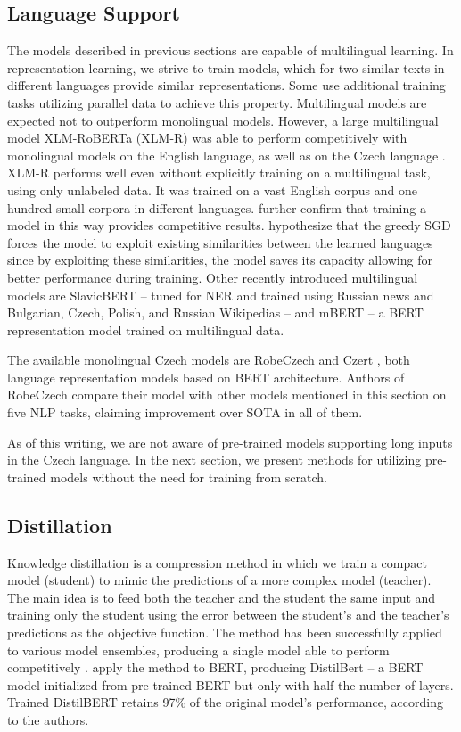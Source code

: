\subsection{Language Support}

The models described in previous sections are capable of multilingual learning.
In representation learning, we strive to train models, which for two similar texts in different languages provide similar representations.
Some \citep{cross-lingual} use additional training tasks utilizing parallel data to achieve this property.
Multilingual models are expected not to outperform monolingual models.
However, a large multilingual model XLM-RoBERTa (XLM-R) \citep{xlmr} was able to perform competitively with monolingual models on the English language, as well as on the Czech language \citep{mackova}.
XLM-R performs well even without explicitly training on a multilingual task, using only unlabeled data.
It was trained on a vast English corpus and one hundred small corpora in different languages. 
\citet{cross-lingual} further confirm that training a model in this way provides competitive results.
\citet{mackova} hypothesize that the greedy SGD forces the model to exploit existing similarities between the learned languages since by exploiting these similarities, the model saves its capacity allowing for better performance during training.
Other recently introduced multilingual models are SlavicBERT \citep{deep-pavlov} -- tuned for NER and trained using Russian news and Bulgarian, Czech, Polish, and Russian Wikipedias -- and mBERT -- a BERT representation model trained on multilingual data.

The available monolingual Czech models are RobeCzech \citep{robeczech} and Czert \citep{czert}, both language representation models based on BERT architecture.
Authors of RobeCzech compare their model with other models mentioned in this section on five NLP tasks, claiming improvement over SOTA in all of them.

As of this writing, we are not aware of pre-trained models supporting long inputs in the Czech language.
In the next section, we present methods for utilizing pre-trained models without the need for training from scratch.

\subsection{Distillation}
\label{subsec:distillation}

Knowledge distillation \citep{kw1, kw2} is a compression method in which we train a compact model (student) to mimic the predictions of a more complex model (teacher).
The main idea is to feed both the teacher and the student the same input and training only the student using the error between the student's and the teacher's predictions as the objective function.
The method has been successfully applied to various model ensembles, producing a single model able to perform competitively \citep{kw2}. 
\citet{distilbert} apply the method to BERT, producing DistilBert -- a BERT model initialized from pre-trained BERT but only with half the number of layers.
Trained DistilBERT retains 97\% of the original model's performance, according to the authors.

